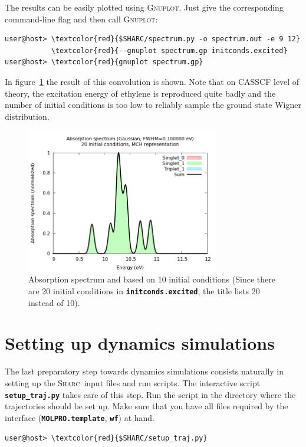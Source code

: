\documentclass[a4paper,11pt,DIV=15,openany]{scrbook}
\newcommand{\sharc}{\textsc{Sharc}}
\newcommand{\ttt}[1]{\textbf{\texttt{#1}}}
\begin{document}
\normalsize
The results can be easily plotted using \textsc{Gnuplot}. Just give the corresponding command-line flag and then call \textsc{Gnuplot}:
\begin{Verbatim}[commandchars=\\\{\}]
user@host> \textcolor{red}{$SHARC/spectrum.py -o spectrum.out -e 9 12}
           \textcolor{red}{--gnuplot spectrum.gp initconds.excited}
user@host> \textcolor{red}{gnuplot spectrum.gp}
\end{Verbatim}


In figure~\ref{fig:spectrum} the result of this convolution is shown. Note that on CASSCF level of theory, the excitation energy of ethylene is reproduced quite badly and the number of initial conditions is too low to reliably sample the ground state Wigner distribution.

\begin{figure}[h]
  \centering
  \includegraphics[width=0.75\textwidth]{figures/spectrum.png}
  \caption{Absorption spectrum and based on 10 initial conditions (Since there are 20 initial conditions in \ttt{initconds.excited}, the title lists 20 instead of 10).}
  \label{fig:spectrum}
\end{figure}











\clearpage
\section{Setting up dynamics simulations}

The last preparatory step towards dynamics simulations consists naturally in setting up the \sharc\ input files and run scripts. The interactive script \ttt{setup\_traj.py} takes care of this step. Run the script in the directory where the trajectories should be set up. Make sure that you have all files required by the interface (\ttt{MOLPRO.template}, \ttt{wf}) at hand.
\begin{Verbatim}[commandchars=\\\{\}]
user@host> \textcolor{red}{$SHARC/setup_traj.py}
\end{Verbatim}
\end{document}
